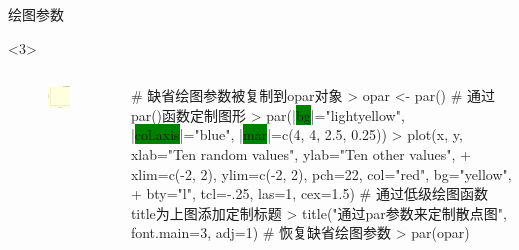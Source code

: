 \documentclass{beamerthemeMono}
\begin{document}
\begin{frame}[t,fragile]{\subsecname}{绘图参数}
\begin{overlayarea}{\textwidth}{\textheight}
\begin{onlyenv}<3>
\begin{columns}
        \begin{column}{.4\textwidth}
          \begin{figure}
            \centering
            \includegraphics[width=\columnwidth]{par.png}
          \end{figure}
        \end{column}

        \begin{column}{.6\textwidth}
 \centering
\begin{rcode}
# 缺省绘图参数被复制到opar对象
> opar <- par()
# 通过par()函数定制图形
> par(|\colorbox{green}{bg}|="lightyellow", |\colorbox{green}{col.axis}|="blue", |\colorbox{green}{mar}|=c(4, 4, 2.5, 0.25))
> plot(x, y, xlab="Ten random values", ylab="Ten other values",
+ xlim=c(-2, 2), ylim=c(-2, 2), pch=22, col="red", bg="yellow",
+ bty="l", tcl=-.25, las=1, cex=1.5)
# 通过低级绘图函数title为上图添加定制标题
> title("通过par参数来定制散点图", font.main=3, adj=1)
# 恢复缺省绘图参数
> par(opar)
\end{rcode}
        \end{column}
      \end{columns}
\end{onlyenv}
\end{overlayarea}  
\end{frame}
\end{document}
